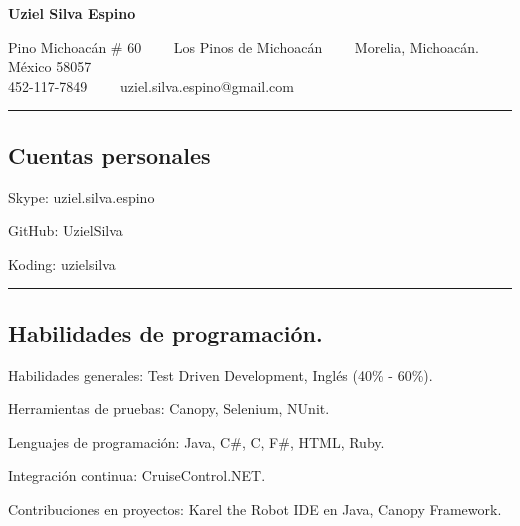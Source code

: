\documentclass[10pt,letterpaper]{article}
\newenvironment{indentsection}[1]%
{\begin{list}{}%
	{\setlength{\leftmargin}{#1}}%
	\item[]%
}
{\end{list}}
\begin{document}
\begin{center}
{\LARGE \textbf{Uziel Silva Espino}}

Pino Michoacán \# 60\ \ \textbullet
\ \ Los Pinos de Michoacán\ \ \textbullet
\ \ Morelia, Michoacán. México 58057
\\
452-117-7849\ \ \textbullet
\ \ uziel.silva.espino@gmail.com
\end{center}

\hrule
\vspace{-0.4em}
\subsection*{Cuentas personales}

\begin{indentsection}{\parindent}
\begin{description*}
	\item[Skype:]
	uziel.silva.espino
	\item[GitHub:]
	UzielSilva
	\item[Koding:]
	uzielsilva
	
\end{description*}
\end{indentsection}

\hrule
\vspace{-0.4em}
\subsection*{Habilidades de programación.}

\begin{indentsection}{\parindent}
\begin{description*}
	\item[Habilidades generales:]
	Test Driven Development, Inglés (40\% - 60\%). 
	
	\item[Herramientas de pruebas:]
	Canopy,
	Selenium,
	NUnit. 
	
	\item[Lenguajes de programación:]
	Java,
	C\#,
	C,
	F\#,
	HTML,
	Ruby. 
	
	\item[Integración continua:]
	CruiseControl.NET. 
	
	\item[Contribuciones en proyectos:]
	Karel the Robot IDE en Java,
	Canopy Framework. 
	
\end{description*}
\end{indentsection}
\end{document}
